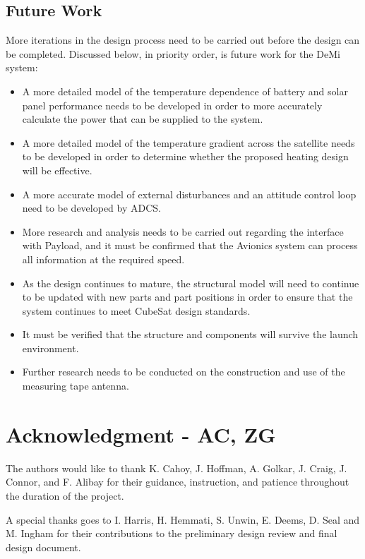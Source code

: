 \documentclass[12pt]{article}
\begin{document}
		\subsection{Future Work}\label{sec:conclustions_futurework}
More iterations in the design process need to be carried out before the design can be completed.  Discussed below, in priority order, is future work for the DeMi system:
\begin{itemize}
\item A more detailed model of the temperature dependence of battery and solar panel performance needs to be developed in order to more accurately calculate the power that can be supplied to the system.  
\item A more detailed model of the temperature gradient across the satellite needs to be developed in order to determine whether the proposed heating design will be effective.  
\item A more accurate model of external disturbances and an attitude control loop need to be developed by ADCS.
\item More research and analysis needs to be carried out regarding the interface with Payload, and it must be confirmed that the Avionics system can process all information at the required speed.  
\item As the design continues to mature, the structural model will need to continue to be updated with new parts and part positions in order to ensure that the system continues to meet CubeSat design standards.
\item It must be verified that the structure and components will survive the launch environment.
\item Further research needs to be conducted on the construction and use of the measuring tape antenna.  
\end{itemize}

		
\FloatBarrier
\newpage

\section{Acknowledgment - AC, ZG}
The authors would like to thank K. Cahoy, J. Hoffman, A. Golkar, J. Craig, J. Connor, and F. Alibay for their guidance, instruction, and patience throughout the duration of the project.

A special thanks goes to I. Harris, H. Hemmati, S. Unwin, E. Deems, D. Seal and M. Ingham for their contributions to the preliminary design review and final design document.
\end{document}

